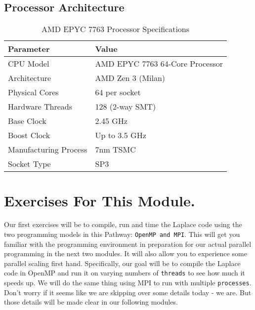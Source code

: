\documentclass[11pt]{article}
\begin{document}
\subsection{Processor Architecture}

\begin{table}[H]
\centering
\caption{AMD EPYC 7763 Processor Specifications}
\label{tab:processor_specs}
\begin{tabular}{@{}ll@{}}
\hline
\textbf{Parameter} & \textbf{Value} \\
\hline
CPU Model & AMD EPYC 7763 64-Core Processor \\
Architecture & AMD Zen 3 (Milan) \\
Physical Cores & 64 per socket \\
Hardware Threads & 128 (2-way SMT) \\
Base Clock & 2.45 GHz \\
Boost Clock & Up to 3.5 GHz \\
Manufacturing Process & 7nm TSMC \\
Socket Type & SP3 \\
\hline
\end{tabular}
\end{table}



\section{Exercises For This Module.}
Our first exercises will be to compile, run and time the Laplace code using the two programming
models in this Pathway: \texttt{OpenMP and MPI}.
This will get you familiar with the programming environment in preparation for our actual parallel
programming in the next two modules.
It will also allow you to experience some parallel scaling first hand.
Specifically, our goal will be to compile the Laplace code in OpenMP and run it on varying
numbers of \texttt{threads} to see how much it speeds up.
We will do the same thing using MPI to run with multiple \texttt{processes}.
Don't worry if it seems like we are skipping over some details today - we are. But those details
will be made clear in our following modules.

\end{document}
